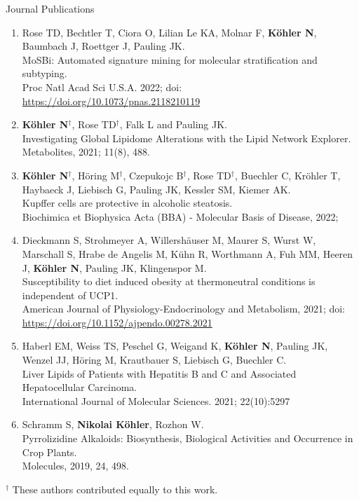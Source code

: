\datedsubsection{}
{%
}
{%
	Journal Publications
}
{%
	\begin{enumerate}
		\item Rose TD, Bechtler T, Ciora O, Lilian Le KA, Molnar F, \textbf{K\"ohler N}, Baumbach J, Roettger J, Pauling JK.\\
			MoSBi: Automated signature mining for molecular stratification and subtyping.\\
			Proc Natl Acad Sci U.S.A. 2022; doi: \url{https://doi.org/10.1073/pnas.2118210119}
		\item \textbf{K\"ohler N}$^{\dagger}$, Rose TD$^{\dagger}$, Falk L and Pauling JK.\\
			Investigating Global Lipidome Alterations with the Lipid Network Explorer.\\
			Metabolites, 2021; 11(8), 488.
		\item \textbf{K\"ohler N}$^{\dagger}$, H\"oring M$^{\dagger}$, Czepukojc B$^{\dagger}$, Rose TD$^{\dagger}$, Buechler C, Kr\"ohler T, Haybaeck J, Liebisch G, Pauling JK, Kessler SM, Kiemer AK.\\
			Kupffer cells are protective in alcoholic steatosis.\\
			Biochimica et Biophysica Acta (BBA) - Molecular Basis of Disease, 2022;
		\item Dieckmann S, Strohmeyer A, Willershäuser M, Maurer S, Wurst W, Marschall S, Hrabe de Angelis M, K\"uhn R, Worthmann A, Fuh MM, Heeren J, \textbf{K\"ohler N}, Pauling JK, Klingenspor M.\\
			Susceptibility to diet induced obesity at thermoneutral conditions is independent of UCP1.\\
			American Journal of Physiology-Endocrinology and Metabolism, 2021; doi: \url{https://doi.org/10.1152/ajpendo.00278.2021}
		\item Haberl EM, Weiss TS, Peschel G, Weigand K, \textbf{K\"ohler N}, Pauling JK, Wenzel JJ, Höring M, Krautbauer S, Liebisch G, Buechler C.\\
			Liver Lipids of Patients with Hepatitis B and C and Associated Hepatocellular Carcinoma.\\
			International Journal of Molecular Sciences. 2021; 22(10):5297
		\item Schramm S, \textbf{Nikolai K\"ohler}, Rozhon W.\\
			Pyrrolizidine Alkaloids: Biosynthesis, Biological Activities and Occurrence in Crop Plants.\\
			Molecules, 2019, 24, 498.
		\setcounter{publicationCounter}{\value{enumi}}	%
	\end{enumerate}
}

\bigskip
{\footnotesize $^{\dagger}$ These authors contributed equally to this work.}

